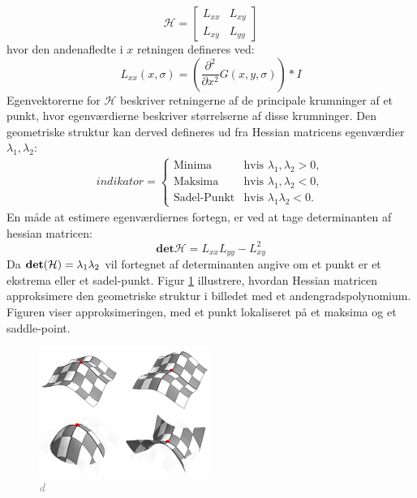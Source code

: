 \begin{equation}
\mathcal{H} = 
 \begin{bmatrix}
 	L_{xx} & L_{xy} \\
 	L_{xy} & L_{yy}
 \end{bmatrix}
 \label{hessianmatrixblob}
\end{equation}
hvor den andenafledte i $x$ retningen defineres ved:
\begin{equation}
L_{xx}(x, \sigma) = (\frac{\partial^2 }{\partial x^2 } G(x,y,\sigma)) * I
\label{lxx}
\end{equation}
Egenvektorerne for $\mathcal{H}$ beskriver retningerne af de principale krumninger af et punkt, hvor egenværdierne beskriver størrelserne af disse krumninger. Den geometriske struktur kan derved defineres ud fra Hessian matricens egenværdier $\lambda_1, \lambda_2$:
\begin{equation}
\begin{split}
indikator = 
\begin{cases}
\text{Minima} & \text{hvis } \lambda_1, \lambda_2 > 0, \\
\text{Maksima}& \text{hvis } \lambda_1, \lambda_2 < 0,  \\
\text{Sadel-Punkt} & \text{hvis } \lambda_1 \lambda_2 < 0.
\end{cases}
\end{split}
\label{maxsurp}
\end{equation}
En måde at estimere egenværdiernes fortegn, er ved at tage determinanten af hessian matricen:
\begin{equation}
\textbf{det}\mathcal{H} = L_{xx}L_{yy}-L_{xy}^2
\label{detofhessian}
\end{equation}
Da $\bold{det}(\mathcal{H})=\lambda_1 \lambda_2$ vil fortegnet af determinanten angive om et punkt er et ekstrema eller et sadel-punkt. Figur \ref{fig:makssad} illustrere, hvordan Hessian matricen approksimere den geometriske struktur i billedet med et andengradspolynomium. Figuren viser approksimeringen, med et punkt lokaliseret på et maksima og et saddle-point.
\begin{figure}[H]
    \centering
    \includegraphics[width=0.50\textwidth]{fig/41.png}
    \vspace{-0.5em}
    \begin{center}
    \caption{\textcolor{gray}{\footnotesize \textit{
d   }}}
    \label{fig:makssad}
     \end{center}
  \end{figure}
